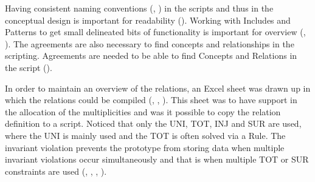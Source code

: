 \label{s:2_1_naming}

Having consistent naming conventions (, ) in the scripts and thus in the conceptual design is important for readability ().
Working with Includes and Patterns to get small delineated bits of functionality is important for overview (,  ).
The agreements are also necessary to find concepts and relationships in the scripting.
Agreements are needed to be able to find Concepts and Relations in the script ().
\label{s:2_2_multiplicity}

In order to maintain an overview of the relations, an Excel sheet was drawn up in which the relations could be compiled (, , ).
This sheet was to have support in the allocation of the multiplicities and was it possible to copy the relation definition to a script.
Noticed that only the UNI, TOT, INJ and SUR are used, where the UNI is mainly used and the TOT is often solved via a Rule.
The invariant violation prevents the prototype from storing data when multiple invariant violations occur simultaneously and that is when multiple TOT or SUR constraints are used (, , , ).
\begin{comment}

\begin{figure}[H]
    \centering
    \texttt{[image: excel relatie overzicht.PNG]}
    \caption{excel relation overview}
    \label{fig:excel relation overview}
\end{figure}
\end{comment}
{}\label{s:2_3_rules}

